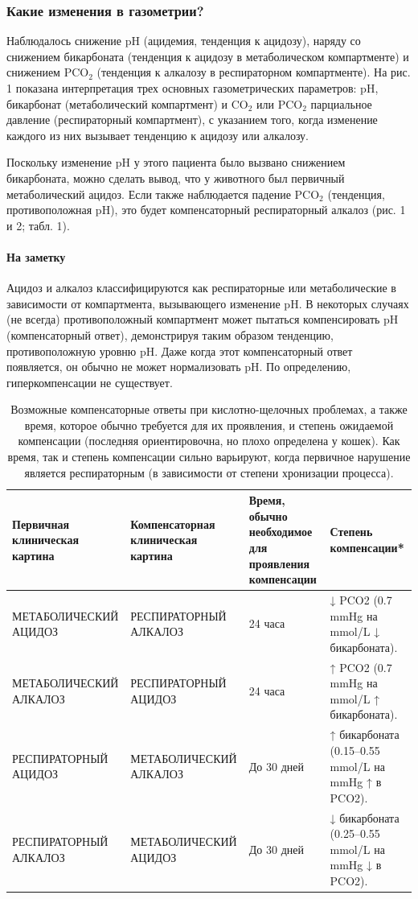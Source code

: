 \documentclass[a4paper,12pt]{book}
\begin{document}
\subsubsection*{Какие изменения в газометрии?}
Наблюдалось снижение pH (ацидемия, тенденция к ацидозу), наряду со снижением бикарбоната (тенденция к ацидозу в метаболическом компартменте) и снижением $\mathrm{PCO}_{2}$ (тенденция к алкалозу в респираторном компартменте). На рис. 1 показана интерпретация трех основных газометрических параметров: $\mathrm{pH}$, бикарбонат (метаболический компартмент) и $\mathrm{CO}_{2}$ или $\mathrm{PCO}_{2}$ парциальное давление (респираторный компартмент), с указанием того, когда изменение каждого из них вызывает тенденцию к ацидозу или алкалозу.

Поскольку изменение pH у этого пациента было вызвано снижением бикарбоната, можно сделать вывод, что у животного был первичный метаболический ацидоз. Если также наблюдается падение $\mathrm{PCO}_{2}$ (тенденция, противоположная pH), это будет компенсаторный респираторный алкалоз (рис. 1 и 2; табл. 1).

\paragraph{На заметку}
Ацидоз и алкалоз классифицируются как респираторные или метаболические в зависимости от компартмента, вызывающего изменение pH. В некоторых случаях (не всегда) противоположный компартмент может пытаться компенсировать pH (компенсаторный ответ), демонстрируя таким образом тенденцию, противоположную уровню pH. Даже когда этот компенсаторный ответ появляется, он обычно не может нормализовать pH. По определению, гиперкомпенсации не существует.

\begin{table}[htbp]
\centering
\caption{Возможные компенсаторные ответы при кислотно-щелочных проблемах, а также время, которое обычно требуется для их проявления, и степень ожидаемой компенсации (последняя ориентировочна, но плохо определена у кошек). Как время, так и степень компенсации сильно варьируют, когда первичное нарушение является респираторным (в зависимости от степени хронизации процесса).}
\begin{tabular}{p{3.5cm}p{3cm}p{3cm}p{3.5cm}}
\toprule
Первичная клиническая картина & Компенсаторная клиническая картина & Время, обычно необходимое для проявления компенсации & Степень компенсации* \\
\midrule
МЕТАБОЛИЧЕСКИЙ АЦИДОЗ & РЕСПИРАТОРНЫЙ АЛКАЛОЗ & 24 часа & ↓ PCO2 (0.7 mmHg на mmol/L ↓ бикарбоната). \\
МЕТАБОЛИЧЕСКИЙ АЛКАЛОЗ & РЕСПИРАТОРНЫЙ АЦИДОЗ & 24 часа & ↑ PCO2 (0.7 mmHg на mmol/L ↑ бикарбоната). \\
РЕСПИРАТОРНЫЙ АЦИДОЗ & МЕТАБОЛИЧЕСКИЙ АЛКАЛОЗ & До 30 дней & ↑ бикарбоната (0.15--0.55 mmol/L на mmHg ↑ в PCO2). \\
РЕСПИРАТОРНЫЙ АЛКАЛОЗ & МЕТАБОЛИЧЕСКИЙ АЦИДОЗ & До 30 дней & ↓ бикарбоната (0.25--0.55 mmol/L на mmHg ↓ в PCO2). \\
\bottomrule
\end{tabular}
\end{table}
\end{document}
